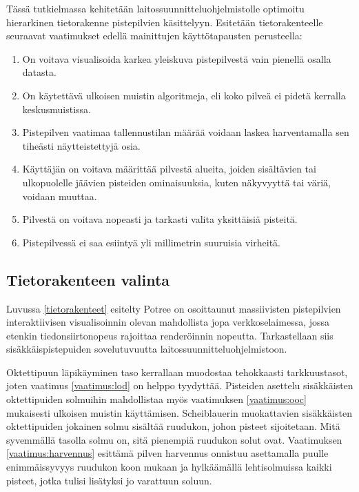 Tässä tutkielmassa kehitetään laitossuunnitteluohjelmistolle optimoitu hierarkinen tietorakenne pistepilvien käsittelyyn. Esitetään tietorakenteelle seuraavat vaatimukset edellä mainittujen käyttötapausten perusteella:
\begin{enumerate}
    \item \label{vaatimus:lod} On voitava visualisoida karkea yleiskuva pistepilvestä vain pienellä osalla datasta. 
    \item \label{vaatimus:ooc} On käytettävä ulkoisen muistin algoritmeja, eli koko pilveä ei pidetä kerralla keskusmuistissa.
    \item \label{vaatimus:harvennus} Pistepilven vaatimaa tallennustilan määrää voidaan laskea harventamalla sen tiheästi näytteistettyjä osia. 
    \item \label{vaatimus:crop} Käyttäjän on voitava määrittää pilvestä alueita, joiden sisältävien tai ulkopuolelle jäävien pisteiden ominaisuuksia, kuten näkyvyyttä tai väriä, voidaan muuttaa.
    \item \label{vaatimus:select} Pilvestä on voitava nopeasti ja tarkasti valita yksittäisiä pisteitä.
    \item \label{vaatimus:virhe} Pistepilvessä ei saa esiintyä yli millimetrin suuruisia virheitä.
\end{enumerate}


\subsection{Tietorakenteen valinta}

Luvussa \ref{tietorakenteet} esitelty Potree on osoittaunut massiivisten pistepilvien interaktiivisen visualisoinnin olevan mahdollista jopa verkkoselaimessa, jossa etenkin tiedonsiirtonopeus rajoittaa renderöinnin nopeutta. Tarkastellaan siis sisäkkäispistepuiden sovelutuvuutta laitossuunnitteluohjelmistoon. 

Oktettipuun läpikäyminen taso kerrallaan muodostaa tehokkaasti tarkkuustasot, joten vaatimus \ref{vaatimus:lod} on helppo tyydyttää. Pisteiden asettelu sisäkkäisten oktettipuiden solmuihin mahdollistaa myös vaatimuksen \ref{vaatimus:ooc} mukaisesti ulkoisen muistin käyttämisen. Scheiblauerin muokattavien sisäkkäisten oktettipuiden jokainen solmu sisältää ruudukon, johon pisteet sijoitetaan. Mitä syvemmällä tasolla solmu on, sitä pienempiä ruudukon solut ovat. Vaatimuksen \ref{vaatimus:harvennus} esittämä pilven harvennus onnistuu asettamalla puulle enimmäissyvyys ruudukon koon mukaan ja hylkäämällä lehtisolmuissa kaikki pisteet, jotka tulisi lisätyksi jo varattuun soluun. 

